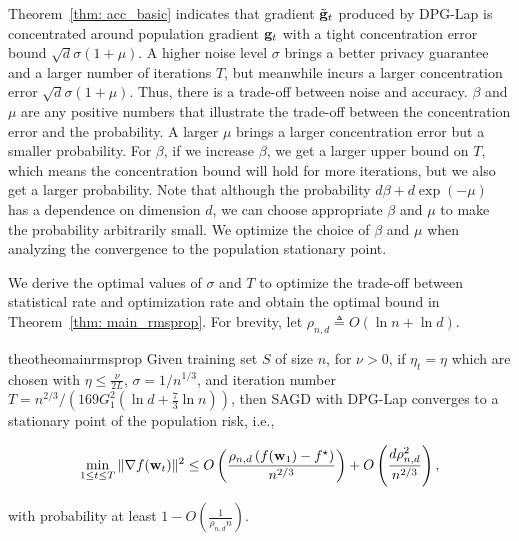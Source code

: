\documentclass[11pt]{article}
\begin{document}
Theorem~\ref{thm: acc_basic} indicates that gradient $\tilde {\mathbf{g}}_t$
produced by DPG-Lap is concentrated around population gradient $\mathbf{g}_t$ with a tight concentration error bound $\sqrt{d}\sigma(1+\mu)$. A higher noise level $\sigma$ brings a better privacy 
guarantee  and a larger number of iterations $T$, but meanwhile incurs a 
larger concentration error $\sqrt{d}\sigma(1+\mu)$. Thus, there is a trade-off between noise and accuracy. $\beta$ and $\mu$ are any positive numbers that illustrate the trade-off between the concentration error and the probability. A larger $\mu$ brings a larger concentration error but a smaller probability. For $\beta$, if we increase $\beta$, we get a larger upper bound on $T$, which means the concentration bound will hold for more iterations, but we also get a larger probability. Note that although the probability $d\beta + d\exp(-\mu)$ has a dependence on dimension $d$, we can choose appropriate $\beta$ and $\mu$ to make the probability arbitrarily small.  We optimize the choice of $\beta$ and $\mu$ when analyzing the convergence to the population stationary point.

We derive the optimal values of $\sigma$ and $T$ to optimize the trade-off between statistical rate and optimization rate and obtain the optimal bound in Theorem~\ref{thm: main_rmsprop}. For brevity, let $\rho_{n,d} \triangleq O \left(\ln n + \ln d\right)$.


\begin{restatable}{theo}{theomainrmsprop}
\label{thm: main_rmsprop}
 Given training set $S$ of size $n$, for $\nu >0$, if $\eta_t = \eta$ which are chosen with $\eta \leq \frac{\nu}{2L}$,  $\sigma = 1/n^{1/3}$, and iteration number $T = n^{2/3}/\left(169G_1^2(\ln d + \frac{7}{3}\ln n)\right)$, then \textsc{SAGD} with DPG-Lap converges to a stationary point of the population risk, i.e., 
 \begin{small}
\begin{equation*}
 \min_{1\leq t \leq T}\|\nabla f(\mathbf{w}_t)\|^2 \leq
 O \left( \frac{\rho_{n,d} \left(f(\mathbf{w}_1) - f^\star \right)}{n^{2/3}} \right) + O \left( \frac{d \rho_{n,d}^2}{n^{2/3}}\right),
\end{equation*}
\end{small}
with probability at least $1-O\left(\frac{1}{\rho_{n,d} n}\right)$.
\end{restatable} 
\end{document}
